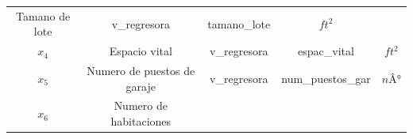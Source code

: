 \documentclass[
]{article}
\begin{document}
\begin{longtable}[]{@{}ccccc@{}}
\begin{minipage}[t]{0.21\columnwidth}
Tamano de lote\strut
\end{minipage} & \begin{minipage}[t]{0.22\columnwidth}\centering
v\_regresora\strut
\end{minipage} & \begin{minipage}[t]{0.23\columnwidth}\centering
tamano\_lote\strut
\end{minipage} & \begin{minipage}[t]{0.06\columnwidth}\centering
\(ft^2\)\strut
\end{minipage}\tabularnewline
\begin{minipage}[t]{0.13\columnwidth}\centering
\(x_4\)\strut
\end{minipage} & \begin{minipage}[t]{0.21\columnwidth}\centering
Espacio vital\strut
\end{minipage} & \begin{minipage}[t]{0.22\columnwidth}\centering
v\_regresora\strut
\end{minipage} & \begin{minipage}[t]{0.23\columnwidth}\centering
espac\_vital\strut
\end{minipage} & \begin{minipage}[t]{0.06\columnwidth}\centering
\(ft^2\)\strut
\end{minipage}\tabularnewline
\begin{minipage}[t]{0.13\columnwidth}\centering
\(x_5\)\strut
\end{minipage} & \begin{minipage}[t]{0.21\columnwidth}\centering
Numero de puestos de garaje\strut
\end{minipage} & \begin{minipage}[t]{0.22\columnwidth}\centering
v\_regresora\strut
\end{minipage} & \begin{minipage}[t]{0.23\columnwidth}\centering
num\_puestos\_gar\strut
\end{minipage} & \begin{minipage}[t]{0.06\columnwidth}\centering
\(nÂ°\)\strut
\end{minipage}\tabularnewline
\begin{minipage}[t]{0.13\columnwidth}\centering
\(x_6\)\strut
\end{minipage} & \begin{minipage}[t]{0.21\columnwidth}\centering
Numero de habitaciones\strut
\end{minipage} & \begin{minipage}[t]{0.22\columnwidth}\centering

\end{minipage}
\end{longtable}
\end{document}
